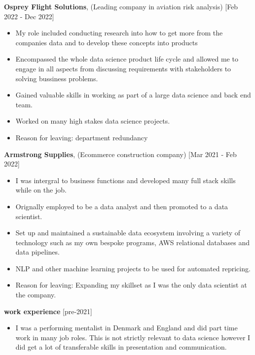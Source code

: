 \documentclass[10pt]{article}
\begin{document}
{{\bf Osprey Flight Solutions}, (Leading company in aviation risk analysis) [Feb 2022 - Dec 2022]
\begin{itemize}
\setlength{\itemsep}{0.10ex}
\item My role included conducting research into how to get more from the companies
data and to develop these concepts into products
\item Encompassed the whole data science product
life cycle and allowed me to engage in all aspects from discussing requirements with stakeholders to
solving bussiness problems.
\item Gained valuable skills in working as part of a large data science and back end team.
\item Worked on many high stakes data science projects.
\item Reason for leaving: department redundancy
\end{itemize}

{\bf Armstrong Supplies}, (Ecommerce construction company) 	[Mar 2021 - Feb 2022]
\begin{itemize}
\setlength{\itemsep}{0.10ex}
\item I was intergral to business functions and developed many full stack skills while on the job.
\item Orignally employed to be a data analyst and then promoted to a data scientist.
\item Set up and maintained a sustainable data ecosystem involving a variety of
technology such as my own bespoke programs, AWS relational databases and data pipelines.
\item NLP and other machine learning projects to be used for automated repricing.
\item Reason for leaving: Expanding my skillset as I was the only data scientist at the company.
\end{itemize}

{\bf work experience} [pre-2021]
\begin{itemize}
\setlength{\itemsep}{0.10ex}
\item I was a performing mentalist in Denmark and England and did part time work in many job roles. This is not strictly relevant to data science however I did get a lot of transferable skills in presentation and communication.
\end{itemize}






}
\end{document}
